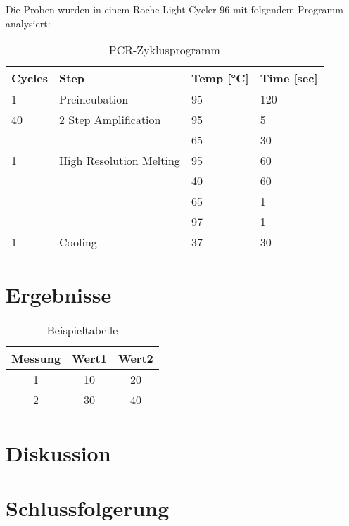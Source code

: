 \documentclass{article}
\begin{document}
Die Proben wurden in einem Roche Light Cycler 96 mit folgendem Programm analysiert:

\begin{table}[H]
\centering
\begin{tabular}{|l|l|l|l|}
\hline
\textbf{Cycles} & \textbf{Step} & \textbf{Temp [°C]} & \textbf{Time [sec]} \\ \hline
1 & Preincubation & 95 & 120 \\ \hline
40 & 2 Step Amplification & 95 & 5 \\ \hline
 &  & 65 & 30 \\ \hline
1 & High Resolution Melting & 95 & 60 \\ \hline
 &  & 40 & 60 \\ \hline
 &  & 65 & 1 \\ \hline
 &  & 97 & 1 \\ \hline
1 & Cooling & 37 & 30 \\ \hline
\end{tabular}
\caption{PCR-Zyklusprogramm}
\end{table}

\section{Ergebnisse}

\begin{table}[H]
    \centering
    \begin{tabular}{|c|c|c|}
    \hline
    Messung & Wert1 & Wert2 \\
    \hline
    1 & 10 & 20 \\
    2 & 30 & 40 \\
    \hline
    \end{tabular}
    \caption{Beispieltabelle}
    \label{tab:beispiel}
\end{table}


\section{Diskussion}

\section{Schlussfolgerung}



\end{document}
